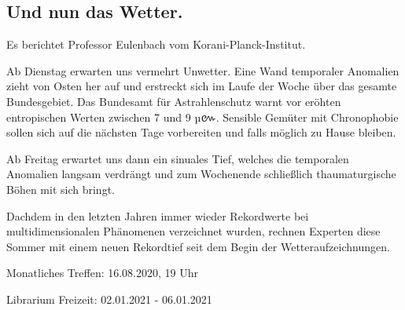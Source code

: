 \documentclass[final]{multiversum}
\begin{document}
\subsection{Und nun das Wetter.} 
Es berichtet Professor Eulenbach vom Korani-Planck-Institut.

Ab Dienstag erwarten uns vermehrt Unwetter. Eine Wand temporaler Anomalien zieht von Osten her auf und erstreckt sich im Laufe der Woche über das gesamte Bundesgebiet. Das Bundesamt für Astrahlenschutz warnt vor eröhten entropischen Werten zwischen 7 und 9 µ{\khmerfont៚}. Sensible Gemüter mit Chronophobie sollen sich auf die nächsten Tage vorbereiten und falls möglich zu Hause bleiben.

Ab Freitag erwartet uns dann ein sinuales Tief, welches die temporalen Anomalien langsam verdrängt und zum Wochenende schließlich thaumaturgische Böhen mit sich bringt. 

Dachdem in den letzten Jahren immer wieder Rekordwerte bei multidimensionalen Phänomenen verzeichnet wurden, rechnen Experten diese Sommer mit einem neuen Rekordtief seit dem Begin der Wetteraufzeichnungen. 

\begin{termine}
\item Monatliches Treffen: 16.08.2020, 19 Uhr
\item Librarium Freizeit: 02.01.2021 - 06.01.2021
\end{termine}
\impressum
\end{document}
